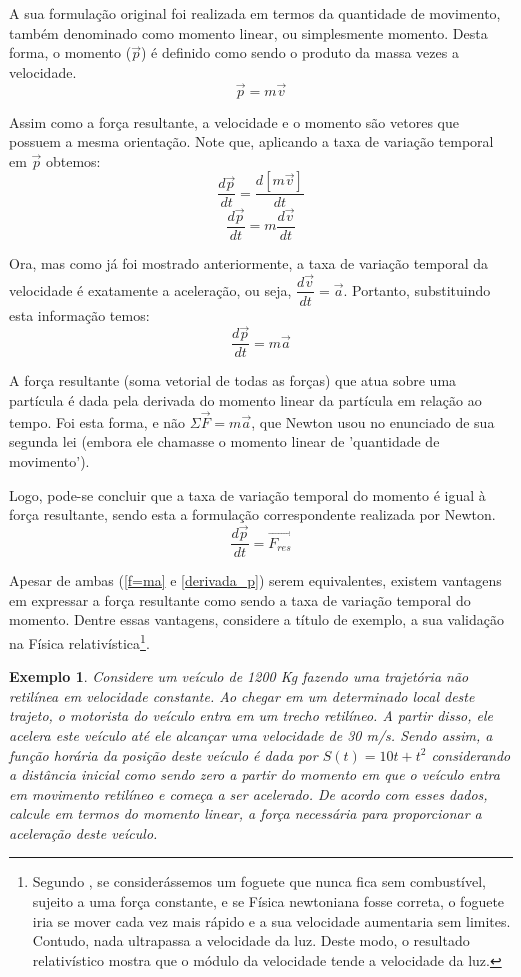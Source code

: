 \documentclass[
	12pt,				%
	openright,			%
    twoside,			%
	a4paper,			%
	chapter=TITLE,		%
	english,			%
	french,				%
	spanish,			%
	brazil				%
	]{abntex2}
\newtheorem{exemplo}{Exemplo}
\numberwithin{lema}{chapter}
\numberwithin{teorema}{chapter}
\numberwithin{definicao}{chapter}
\numberwithin{exemplo}{chapter}
\numberwithin{figure}{chapter}
\begin{document}
A sua formulação original foi realizada em termos da quantidade de movimento, também denominado como momento linear, ou simplesmente momento. Desta forma, o momento ($\vec{p}$) é definido como sendo o produto da massa vezes a velocidade. 
$$\vec{p} = m\vec{v}$$

Assim como a força resultante, a velocidade e o momento são vetores que possuem a mesma orientação. Note que, aplicando a taxa de variação temporal em $\vec{p}$ obtemos:
$$\dfrac{d\vec{p}}{dt} = \dfrac{d[m\vec{v}]}{dt}$$
$$\dfrac{d\vec{p}}{dt} = m\dfrac{d\vec{v}}{dt}$$

Ora, mas como já foi mostrado anteriormente, a taxa de variação temporal da velocidade é exatamente a aceleração, ou seja, $\dfrac{d\vec{v}}{dt} = \vec{a}$. Portanto, substituindo esta informação temos:
$$\dfrac{d\vec{p}}{dt} = m\vec{a}$$

\begin{citacao}
	A força resultante (soma vetorial de todas as forças) que atua sobre uma partícula é dada pela derivada do momento linear da partícula em relação ao tempo. Foi esta forma, e não $\varSigma\vec{F} = m\vec{a}$, que Newton usou no enunciado de sua segunda lei (embora ele chamasse o momento linear de 'quantidade de movimento')\cite[p. 248]{fisica_1}.
\end{citacao}

Logo, pode-se concluir que a taxa de variação temporal do momento é igual à força resultante, sendo esta a formulação correspondente realizada por Newton.
\begin{equation}
	\label{derivada_p}
	\dfrac{d\vec{p}}{dt} = \vec{F_{res}}
\end{equation}

Apesar de ambas (\ref{f=ma} e \ref{derivada_p}) serem equivalentes, existem vantagens em expressar a força resultante como sendo a taxa de variação temporal do momento. Dentre essas vantagens, considere a título de exemplo, a sua validação na Física relativística\footnote{Segundo , se considerássemos um foguete que nunca fica sem combustível, sujeito a uma força constante, e se Física newtoniana fosse correta, o foguete iria se mover cada vez mais rápido e a sua velocidade aumentaria sem limites. Contudo, nada ultrapassa a velocidade da luz. Deste modo, o resultado relativístico mostra que o módulo da velocidade tende a velocidade da luz.}.  

\begin{exemplo}
	Considere um veículo de 1200 Kg fazendo uma trajetória não retilínea em velocidade constante. Ao chegar em um determinado local deste trajeto, o motorista do veículo entra em um trecho retilíneo. A partir disso, ele acelera este veículo até ele alcançar uma velocidade de 30 m/s. Sendo assim, a função horária da posição deste veículo é dada por $S(t) = 10t + t^{2}$ considerando a distância inicial como sendo zero a partir do momento em que o veículo entra em movimento retilíneo e começa a ser acelerado. De acordo com esses dados, calcule em termos do momento linear, a força necessária para proporcionar a aceleração deste veículo.
\end{exemplo}
\end{document}
